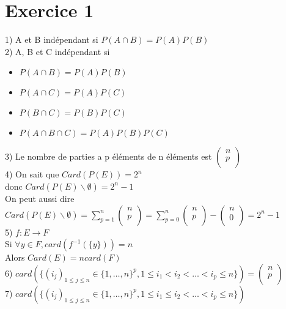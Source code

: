 \documentclass{article}
\author{Frederic Becerril}
\begin{document}
\part*{Exercice 1}

1) A et B indépendant si $P(A \cap B) = P(A)P(B)$\\
2) A, B et C indépendant si
\begin{itemize}
    \item $P(A \cap B) = P(A)P(B)$
    \item $P(A \cap C) = P(A)P(C)$
    \item $P(B \cap C) = P(B)P(C)$
    \item $P(A \cap B \cap C) = P(A)P(B)P(C)$
\end{itemize}
3) Le nombre de parties a p éléments de n éléments est $\begin{pmatrix}
    n\\
    p\\
\end{pmatrix}$\\
4) On sait que $Card(P(E)) = 2^n$\\
donc $Card(P(E) \backslash {\emptyset}) = 2^n -1$\\
On peut aussi dire $Card(P(E) \backslash {\emptyset}) = \sum_{p=1}^n \begin{pmatrix}
    n\\
    p\\
\end{pmatrix} = \sum_{p=0}^n \begin{pmatrix}
    n\\
    p\\
\end{pmatrix} - \begin{pmatrix}
    n\\
    0\\
\end{pmatrix} = 2^n - 1$\\
5) $f : E \rightarrow F$\\
Si $\forall y \in F, card(f^{-1}(\{y\})) = n$\\
Alors $Card(E) = n card(F)$\\
6) $card(\{(i_j)_{1 \leq j \leq n} \in \{1, \dots, n\}^p, 1 \leq i_1 < i_2 < \dots < i_p \leq n\})
= \begin{pmatrix}
    n\\
    p\\
\end{pmatrix}$\\
7) $card(\{(i_j)_{1 \leq j \leq n} \in \{1, \dots, n\}^p, 1 \leq i_1 \leq i_2 < \dots < i_p \leq n\})$\\
\end{document}
